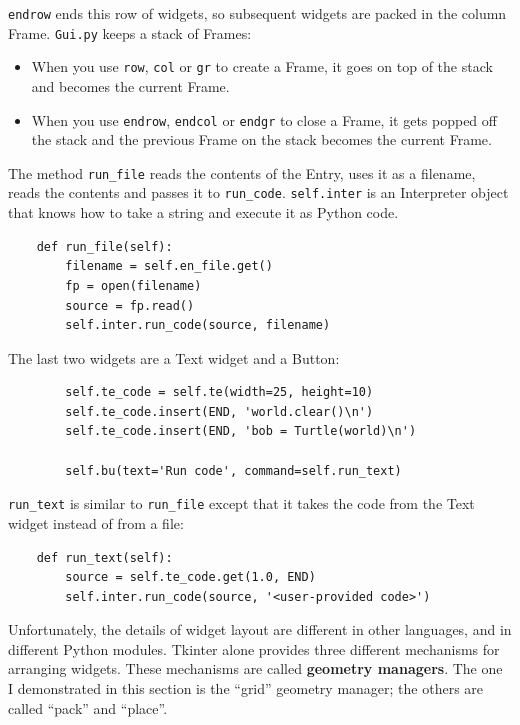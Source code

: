\documentclass[10pt]{book}
\begin{document}
{\tt endrow} ends this row of widgets, so subsequent widgets are
packed in the column Frame.  {\tt Gui.py} keeps a stack of Frames:

\begin{itemize}

\item When you use {\tt row}, {\tt col} or {\tt gr} to create a Frame,
it goes on top of the stack and becomes the current Frame.

\item When you use {\tt endrow}, {\tt endcol} or {\tt endgr} to close
a Frame, it gets popped off the stack and the previous Frame on the
stack becomes the current Frame.

\end{itemize} 

The method \verb"run_file" reads the contents of the Entry,
uses it as a filename, reads the contents
and passes it to \verb"run_code".  {\tt self.inter} is an
Interpreter object that knows how to take a string and
execute it as Python code.

\beforeverb
\begin{verbatim}
    def run_file(self):
        filename = self.en_file.get()
        fp = open(filename)
        source = fp.read()
        self.inter.run_code(source, filename)
\end{verbatim}
\afterverb
%
The last two widgets are a Text widget and a Button:

\beforeverb
\begin{verbatim}
        self.te_code = self.te(width=25, height=10)
        self.te_code.insert(END, 'world.clear()\n')
        self.te_code.insert(END, 'bob = Turtle(world)\n')

        self.bu(text='Run code', command=self.run_text)
\end{verbatim}
\afterverb
%
\verb"run_text" is similar to \verb"run_file" except that it takes
the code from the Text widget instead of from a file:

\beforeverb
\begin{verbatim}
    def run_text(self):
        source = self.te_code.get(1.0, END)
        self.inter.run_code(source, '<user-provided code>')
\end{verbatim}
\afterverb
%
Unfortunately, the details of widget layout are different in
other languages, and in different Python modules.
Tkinter alone provides three different mechanisms for arranging
widgets.  These mechanisms are called {\bf geometry managers}.
The one I demonstrated in this section is the ``grid'' geometry
manager; the others are called ``pack'' and ``place''.
\end{document}

